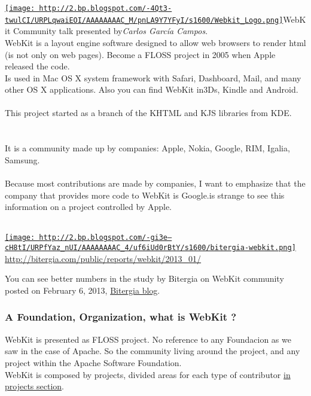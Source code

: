 \href{http://2.bp.blogspot.com/-4Qt3-twulCI/URPLqwaiEOI/AAAAAAAAC_M/pnLA9Y7YFyI/s1600/Webkit_Logo.png}{
\texttt{[image: http://2.bp.blogspot.com/-4Qt3-twulCI/URPLqwaiEOI/AAAAAAAAC\_M/pnLA9Y7YFyI/s1600/Webkit\_Logo.png]}}WebKit Community talk presented by\nolinebreak\textit{Carlos García Campos}.
\\ WebKit is a layout engine software designed to allow web browsers to render html (is not only on web pages). Become a FLOSS project in 2005 when Apple released the code.
\\ Is used in Mac OS X system framework with Safari, Dashboard, Mail, and many other OS X applications. Also you can find WebKit in\nolinebreakNintendo 3Ds, Kindle and Android.
\\
\\ This project started as a branch of the KHTML and KJS libraries from KDE.
\\
\\
\\ It is a community made ​​up by companies: Apple, Nokia, Google, RIM, Igalia, Samsung.
\\
\\ Because most contributions are made by companies, I want to emphasize that the company that provides more code to WebKit is Google.\nolinebreakIt is strange to see this information on a project controlled by Apple.
\\
\\
\begin{tabular}\href{http://2.bp.blogspot.com/-gi3e--cH8tI/URPfYaz_nUI/AAAAAAAAC_4/uf6iUd0rBtY/s1600/bitergia-webkit.png}{
\texttt{[image: http://2.bp.blogspot.com/-gi3e--cH8tI/URPfYaz\_nUI/AAAAAAAAC\_4/uf6iUd0rBtY/s1600/bitergia-webkit.png]}} \\ 
\href{http://bitergia.com/public/reports/webkit/2013_01/}{http://bitergia.com/public/reports/webkit/2013\_01/}
\end{tabular} You can see better numbers in the study by Bitergia on WebKit community posted on February 6, 2013, \href{http://blog.bitergia.com/2013/02/06/report-on-the-activity-of-companies-in-the-webkit-project/}{Bitergia blog}.
\\

\subsubsection{ A Foundation, Organization, what is WebKit ?} WebKit is presented as FLOSS project. No reference to any Foundacion as we saw in the case of Apache. So the community living around the project, and any project within the Apache Software Foundation.
\\ WebKit is composed by projects, divided areas for each type of contributor \href{http://www.webkit.org/projects/}{in projects section}.

